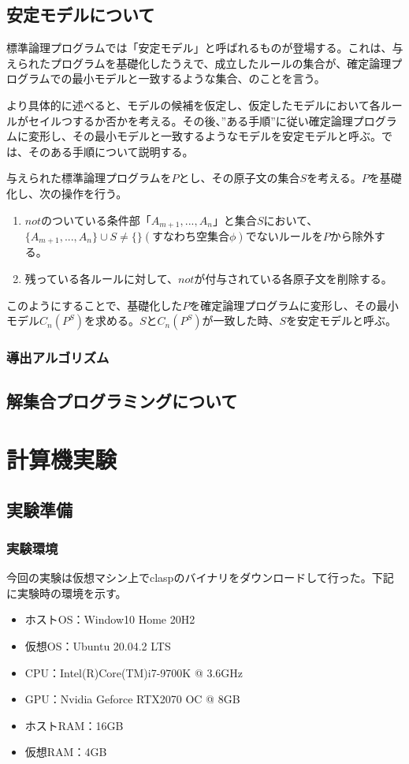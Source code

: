 \documentclass[dvipdfmx]{jsarticle}
\begin{document}
\subsection{安定モデルについて}
標準論理プログラムでは「安定モデル」と呼ばれるものが登場する。これは、与えられたプログラムを基礎化したうえで、成立したルールの集合が、確定論理プログラムでの最小モデルと一致するような集合、のことを言う。\par
より具体的に述べると、モデルの候補を仮定し、仮定したモデルにおいて各ルールがセイルつするか否かを考える。その後、”ある手順”に従い確定論理プログラムに変形し、その最小モデルと一致するようなモデルを安定モデルと呼ぶ。では、そのある手順について説明する。\par
与えられた標準論理プログラムを$P$とし、その原子文の集合$S$を考える。$P$を基礎化し、次の操作を行う。
\begin{enumerate}
  \item $not$のついている条件部「$A_{m+1}, ..., A_{n}$」と集合$S$において、$\{A_{m+1}, ..., A_{n}\} \cup S \neq \{\}(すなわち空集合\phi)$でないルールを$P$から除外する。
  \item 残っている各ルールに対して、$not$が付与されている各原子文を削除する。
\end{enumerate}
このようにすることで、基礎化した$P$を確定論理プログラムに変形し、その最小モデル$C_{n}(P^{S})$を求める。$S$と$C_{n}(P^{S})$が一致した時、$S$を安定モデルと呼ぶ。
  \subsubsection{導出アルゴリズム}
\subsection{解集合プログラミングについて}

\section{計算機実験}
\subsection{実験準備}
  \subsubsection{実験環境}
  今回の実験は仮想マシン上でclaspのバイナリをダウンロードして行った。下記に実験時の環境を示す。
  \begin{itemize}
    \item ホストOS：Window10 Home 20H2
    \item 仮想OS：Ubuntu 20.04.2 LTS
    \item CPU：Intel(R)Core(TM)i7-9700K @ 3.6GHz
    \item GPU：Nvidia Geforce RTX2070 OC @ 8GB
    \item ホストRAM：16GB
    \item 仮想RAM：4GB
  \end{itemize}
\end{document}
